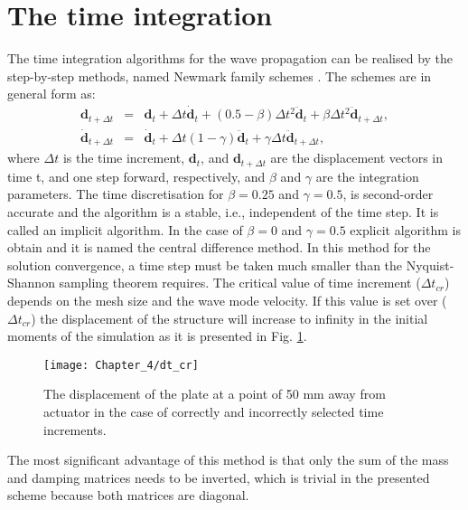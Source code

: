 \section{The time integration}
\label{sec:time}

The time integration algorithms for the wave propagation can be realised by the step-by-step methods, named Newmark family schemes \cite{newmark1959method}.
The schemes are in general form as:
\begin{eqnarray}
	\label{eq:u_newmark}
	\textbf{d}_{t+\Delta t} & = & \textbf{d}_{t} +\Delta t \dot{\textbf{d}}_{t} + \left( 0.5 - \beta \right)\Delta t^2\ddot{\textbf{d}}_{t} + \beta \Delta t^2\ddot{\textbf{d}}_{t+\Delta t},\\
	\dot{\textbf{d}}_{t+\Delta t} & = & \dot{\textbf{d}}_{t} + \Delta t\left(1-\gamma\right)\ddot{\textbf{d}}_{t} + \gamma \Delta t\ddot{\textbf{d}}_{t+\Delta t},
\end{eqnarray}
%
%
where \(\Delta t\) is the time increment, \(\textbf{d}_{t}\), and \(\textbf{d}_{t+\Delta t}\) are the displacement vectors in time t, and one step forward, respectively, and \(\beta\) and \(\gamma\) are the integration parameters.
The time discretisation for \(\beta = 0.25\) and \(\gamma = 0.5\), is second-order accurate and the algorithm is a stable, i.e., independent of the time step. It is called an implicit algorithm.
In the case of \(\beta = 0\) and \(\gamma = 0.5\) explicit algorithm is obtain and it is named the central difference method.
In this method for the solution convergence, a time step must be taken much smaller than the Nyquist-Shannon sampling theorem requires.
The critical value of time increment (\(\Delta t_{cr}\)) depends on the mesh size and the wave mode velocity.
If this value is set over (\(\Delta t_{cr}\)) the displacement of the structure will increase to infinity in the initial moments of the simulation as it is presented in Fig. \ref{fig:dt_cr}.
\begin{figure}[!tbh]
	\begin{center}
		\texttt{[image: Chapter\_4/dt\_cr]}
	\end{center}
	\caption{The displacement of the plate at a point of 50 mm away from actuator in the case of correctly and incorrectly selected time increments.}
	\label{fig:dt_cr}
\end{figure}
The most significant advantage of this method is that only the sum of the mass and damping matrices needs to be inverted, which is trivial in the presented scheme because both matrices are diagonal.

